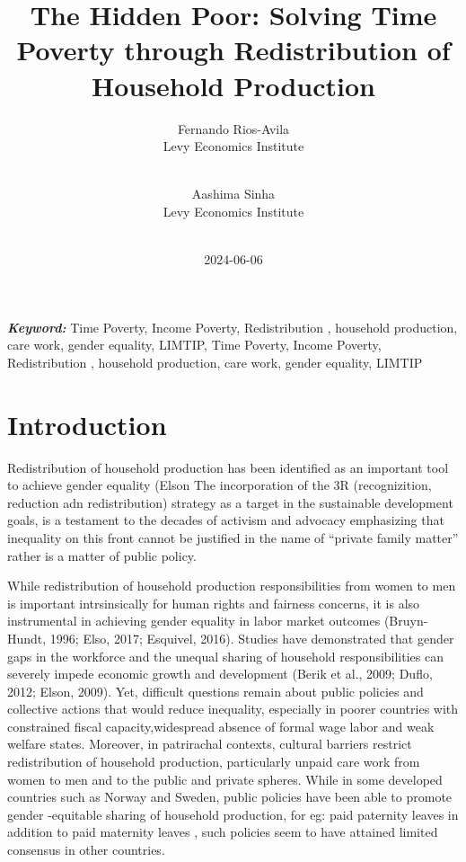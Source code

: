 \documentclass[
  11pt,
]{article}
\title{The Hidden Poor: Solving Time Poverty through Redistribution of
Household Production}
\author{
Fernando Rios-Avila\\
Levy Economics Institute\\
\\
\and 
Aashima Sinha\\
Levy Economics Institute\\
\\
}
\date{2024-06-06}
\begin{document}
\def\spacingset#1{\renewcommand{\baselinestretch}%
{#1}\small\normalsize} \spacingset{1}


\maketitle
\begin{abstract}
\lipsum[1]
\end{abstract}
 
\vspace{.2in}

\textbf{\textit{Keyword: }}
    Time Poverty, Income Poverty, Redistribution , household production,
care work, gender equality, LIMTIP, 
    Time Poverty, Income Poverty, Redistribution , household production,
care work, gender equality, LIMTIP 


\thispagestyle{empty}
\clearpage{}
\newpage
\spacingset{1.2} %
\section{Introduction}\label{introduction}

Redistribution of household production has been identified as an
important tool to achieve gender equality (Elson The incorporation of
the 3R (recognizition, reduction adn redistribution) strategy as a
target in the sustainable development goals, is a testament to the
decades of activism and advocacy emphasizing that inequality on this
front cannot be justified in the name of ``private family matter''
rather is a matter of public policy.

While redistribution of household production responsibilities from women
to men is important intrsinsically for human rights and fairness
concerns, it is also instrumental in achieving gender equality in labor
market outcomes (Bruyn-Hundt, 1996; Elso, 2017; Esquivel, 2016). Studies
have demonstrated that gender gaps in the workforce and the unequal
sharing of household responsibilities can severely impede economic
growth and development (Berik et al., 2009; Duflo, 2012; Elson, 2009).
Yet, difficult questions remain about public policies and collective
actions that would reduce inequality, especially in poorer countries
with constrained fiscal capacity,widespread absence of formal wage labor
and weak welfare states. Moreover, in patrirachal contexts, cultural
barriers restrict redistribution of household production, particularly
unpaid care work from women to men and to the public and private
spheres. While in some developed countries such as Norway and Sweden,
public policies have been able to promote gender -equitable sharing of
household production, for eg: paid paternity leaves in addition to paid
maternity leaves , such policies seem to have attained limited consensus
in other countries.
\end{document}
